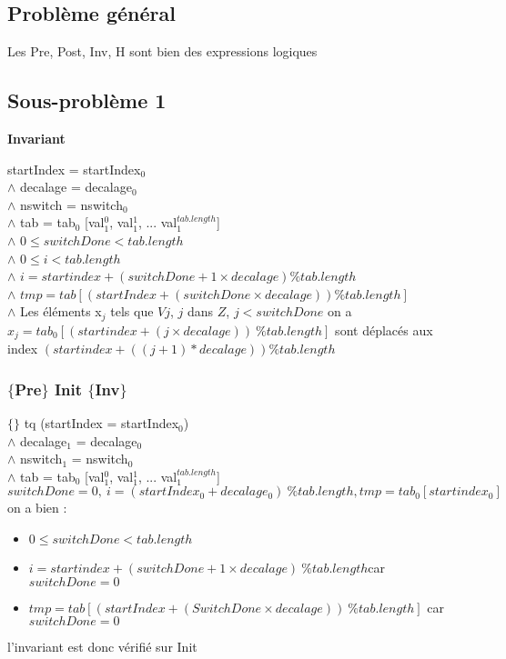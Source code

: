 \subsection{Problème général}
Les Pre, Post, Inv, H sont bien des expressions logiques 
\subsection{Sous-problème 1}
\textbf{Invariant}

	startIndex = startIndex$_{0}$\\
$\wedge$ decalage = decalage$_{0}$\\
$\wedge$ nswitch = nswitch$_{0}$\\
$\wedge$ tab = tab$_{0}$ [val$_{1}^{0}$, val$_{1}^{1}$, ... val$_{1}^{tab.length}$]\\
$\wedge$ $0\leq switchDone < tab.length$\\
$\wedge$ $0\leq i < tab.length$\\
$\wedge$ $i = startindex + (switchDone+1\times decalage) \% tab.length$\\
$\wedge$ $tmp = tab[(startIndex + (switchDone\times decalage))  \% tab.length]$\\
$\wedge$ Les éléments x$_{j}$ tels que $Vj$, $j$ dans $Z$, $j<switchDone$ on a $x_{j}=tab_{0}[(startindex + (j\times decalage))\ \% tab.length]$ sont déplacés aux index $(startindex + ((j+1)* decalage))\%tab.length$\\

\subsubsection*{$\{$Pre$\}$ Init $\{$Inv$\}$}

$\{\}$ tq (startIndex = startIndex$_{0}$) \\
$\wedge$ decalage$_{1}$ = decalage$_{0}$\\
$\wedge$ nswitch$_{1}$ = nswitch$_{0}$\\
$\wedge$ tab = tab$_{0}$ [val$_{1}^{0}$, val$_{1}^{1}$, ... val$_{1}^{tab.length}$]\\


{$switchDone = 0,\ i = (startIndex_0 + decalage_0)\ \% tab.length, tmp = tab_0[startindex_0]$}\\
on a bien : 
\begin{itemize}
	\item $0\leq switchDone < tab.length$
	\item $i = startindex + (switchDone+1\times decalage)\ \% tab.length $car$ switchDone = 0$
	\item $tmp = tab[(startIndex + (SwitchDone\times decalage))\ \% tab.length]$ car $switchDone = 0$
\end{itemize}
l'invariant est donc vérifié sur Init

